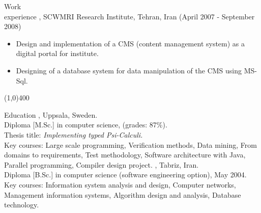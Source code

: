 \documentclass{resume}
\begin{document}
\begin{category}{Work \\experience}
, SCWMRI Research Institute, 
Tehran, Iran (April 2007 - September 2008)
\begin{itemize} 
\item Design and implementation of a CMS (content management system) as a 
 digital portal for institute.
\item Designing of a database system for data manipulation of the CMS using MS-Sql.
\end{itemize}

\end{category}

\begin{center}
\line(1,0){400}
\end{center}

\begin{category}{Education}
, Uppsala, Sweden. \\
Diploma [M.Sc.] in computer science, (grades: 87\%).\\
Thesis title: {\em Implementing typed Psi-Calculi.}\\
Key courses: Large scale programming, Verification methods, Data mining, 
From domains to requirements, Test methodology,
Software architecture with Java, Parallel programming, Compiler design project. 
, Tabriz, Iran.\\
Diploma [B.Sc.] in computer science (software engineering option), May 2004.\\
Key courses: Information system analysis and design, Computer networks, 
Management information systems, Algorithm design and analysis, Database technology.

\end{category}
\end{document}
